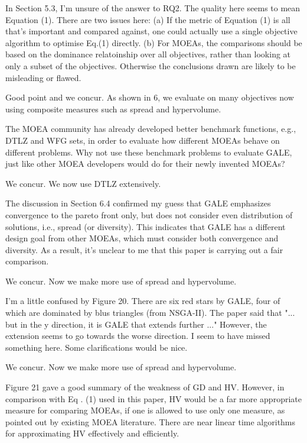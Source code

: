 \documentclass[10pt,journal,compsoc]{IEEEtran}
\newenvironment{changed}{\par}{\par}
\begin{document}
In Section 5.3, I'm unsure of the answer to RQ2. The quality here seems
to mean Equation (1). There are two issues here: (a) If the metric of
Equation (1) is all that's important and compared against, one could
actually use a single objective algorithm to optimise Eq.(1) directly. (b)
For MOEAs, the comparisons should be based on the dominance relatoinship
over all objectives, rather than looking at only a subset of the
objectives. Otherwise the conclusions drawn are likely to be misleading or
flawed.
\begin{changed}
Good point and we concur. As shown in {\textsection}6, we evaluate on many objectives
now using composite measures such as spread and hypervolume.
\end{changed}


The MOEA community has already
developed better benchmark functions, e.g., DTLZ and WFG sets, in order to
evaluate how different MOEAs behave on different problems. Why not use
these benchmark problems to evaluate GALE, just like other MOEA developers
would do for their newly invented MOEAs?

\begin{changed}
We concur. We now use DTLZ extensively.
\end{changed}


The discussion in Section 6.4 confirmed my guess that GALE emphasizes
convergence to the pareto front only, but does not consider even
distribution of solutions, i.e., spread (or diversity). This indicates
that GALE has a different design goal from other MOEAs, which must
consider both convergence and diversity. As a result, it's unclear to me
that this paper is carrying out a fair comparison.


\begin{changed}
We concur. Now we make more use of spread and hypervolume.
\end{changed}

I'm a little confused by Figure 20. There are six red stars by GALE, four
of which are dominated by blus triangles (from NSGA-II). The paper said that
"... but in the y direction, it is GALE that extends further ..." However, the
extension seems to go towards the worse direction. I seem to have missed
something here. Some clarifications would be nice.


\begin{changed}
We concur. Now we make more use of spread and hypervolume.
\end{changed}


Figure 21 gave a good summary of the weakness of GD and HV. However, in
comparison with Eq . (1) used in this paper, HV would be a far more
appropriate measure for comparing MOEAs, if one is allowed to use only one
measure, as pointed out by existing MOEA literature. There are near linear
time algorithms for approximating HV effectively and efficiently.
\end{document}
